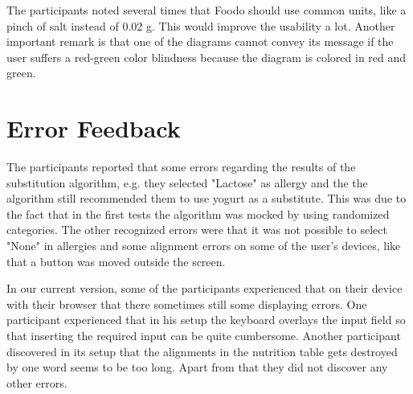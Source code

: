 
The participants noted several times that Foodo should use common units, like a pinch of salt instead of 0.02 g. This would improve the usability a lot. Another important remark is that one of the diagrams cannot convey its message if the user suffers a red-green color blindness because the diagram is colored in red and green. 

\section{Error Feedback}


The participants reported that some errors regarding the results of the substitution algorithm, e.g. they selected "Lactose" as allergy and the the algorithm still recommended them to use yogurt as a substitute. This was due to the fact that in the first tests the algorithm was mocked by using randomized categories. The other recognized errors were that it was not possible to select "None" in allergies and some alignment errors on some of the user's devices, like that a button was moved outside the screen.


In our current version, some of the participants experienced that on their  device with their browser that there sometimes still some displaying errors. One participant experienced that in his setup the keyboard overlays the input field so that inserting the required input can be quite cumbersome. Another participant discovered in its setup that the alignments in the nutrition table gets destroyed by one word seems to be too long. Apart from that they did not discover any other errors.


